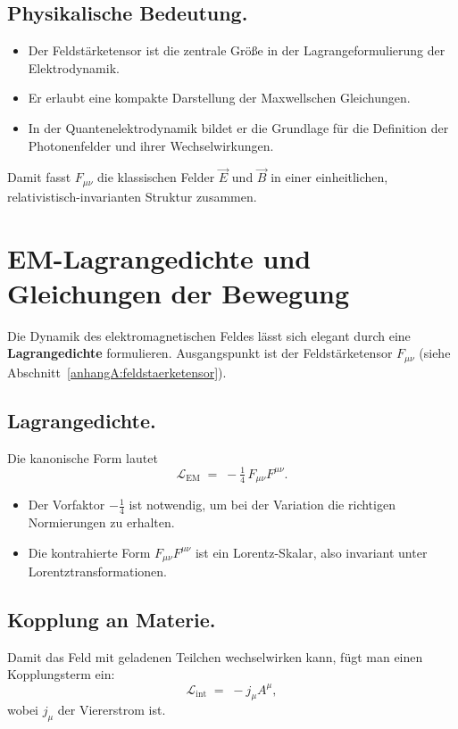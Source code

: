 \subsection*{Physikalische Bedeutung.}
\begin{itemize}
	\item Der Feldstärketensor ist die zentrale Größe in der 
	Lagrangeformulierung der Elektrodynamik.
	\item Er erlaubt eine kompakte Darstellung der Maxwellschen Gleichungen.
	\item In der Quantenelektrodynamik bildet er die Grundlage 
	für die Definition der Photonenfelder und ihrer Wechselwirkungen.
\end{itemize}

\medskip
Damit fasst \( F_{\mu\nu} \) die klassischen Felder \( \vec{E} \) und \( \vec{B} \) 
in einer einheitlichen, relativistisch-invarianten Struktur zusammen.
\section{EM-Lagrangedichte und \newline Gleichungen der Bewegung}
\label{anhangA:lagrange_em}

Die Dynamik des elektromagnetischen Feldes lässt sich elegant 
durch eine \textbf{Lagrangedichte} formulieren. 
Ausgangspunkt ist der Feldstärketensor \( F_{\mu\nu} \) 
(siehe Abschnitt~\ref{anhangA:feldstaerketensor}).

\subsection*{Lagrangedichte.}
Die kanonische Form lautet
\[
\mathcal{L}_{\text{EM}} \;=\; -\tfrac{1}{4} \, F_{\mu\nu} F^{\mu\nu}.
\]

\begin{itemize}
	\item Der Vorfaktor \(-\tfrac{1}{4}\) ist notwendig, um bei der Variation 
	die richtigen Normierungen zu erhalten.
	\item Die kontrahierte Form \(F_{\mu\nu} F^{\mu\nu}\) 
	ist ein Lorentz-Skalar, also invariant unter Lorentztransformationen.
\end{itemize}

\subsection*{Kopplung an Materie.}
Damit das Feld mit geladenen Teilchen wechselwirken kann,
fügt man einen Kopplungsterm ein:
\[
\mathcal{L}_{\text{int}} \;=\; - j_\mu A^\mu ,
\]
wobei \( j_\mu \) der Viererstrom ist.


